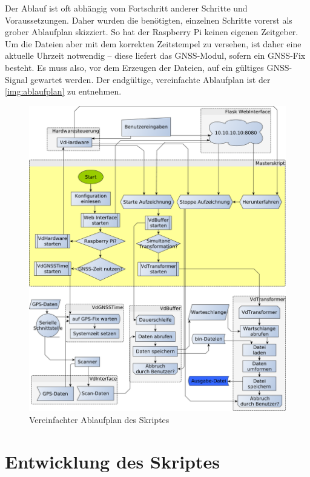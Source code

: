 \documentclass[a4paper,12pt,bibliography=totoc, listof=totoc,titlepage,pointlessnumbers]{scrreprt}
\begin{document}
Der Ablauf ist oft abhängig vom Fortschritt anderer Schritte und Voraussetzungen. Daher wurden die benötigten, einzelnen Schritte vorerst als grober Ablaufplan skizziert. So hat der Rasp\-berry Pi keinen eigenen Zeitgeber. Um die Dateien aber mit dem korrekten Zeitstempel zu versehen, ist daher eine aktuelle Uhrzeit notwendig -- diese liefert das GNSS-Modul, sofern ein GNSS-Fix besteht. Es muss also, vor dem Erzeugen der Dateien, auf ein gültiges GNSS-Signal gewartet werden. Der endgültige, vereinfachte Ablaufplan ist der \autoref{img:ablaufplan} zu entnehmen. 
\begin{figure}
 \centering
 \includegraphics[width=1\textwidth]{./img/ablaufplan.pdf}
 \caption{Vereinfachter Ablaufplan des Skriptes}
 \label{img:ablaufplan}
\end{figure}

\chapter{Entwicklung des Skriptes}
\label{c:skript}
\end{document}
